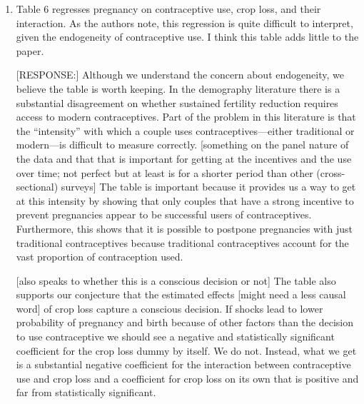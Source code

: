\documentclass[letterpaper,12pt]{article}
\begin{document}
\begin{enumerate}
[RESPONSE:] The 0.000 coefficients were predominantly for variables
involving initial assets. 
We have changed the variable definition for assets, so that it is
now measured in 1,000,000 TZS. 

Note that there are still a few places---mainly for estimations
involving the use of modern contraceptives---where the estimated 
coefficients are so small that presenting additional digits does not make
much economic sense.
In those cases the standard errors are always equal to or larger than
the coefficients.
See, for example, Table A-8 on the effects of log crop loss.


\item Table 6 regresses pregnancy on contraceptive use, crop loss, and
their interaction. As the authors note, this regression is quite
difficult to interpret, given the endogeneity of contraceptive use. I
think this table adds little to the paper.

[RESPONSE:] Although we understand the concern about endogeneity, 
we believe the table is worth keeping. 
In the demography literature there is a substantial disagreement on whether
sustained fertility reduction requires access to modern contraceptives.
Part of the problem in this literature is that the ``intensity'' with
which a couple uses contraceptives---either traditional or modern---is
difficult to measure correctly.
[something on the panel nature of the data and that that is important
for getting at the incentives and the use over time; not perfect but
at least is for a shorter period than other (cross-sectional) surveys]
The table is important because it provides us a way to get at this
intensity by showing that only couples that have a strong incentive to
prevent pregnancies appear to be successful users of contraceptives.
Furthermore, this shows that it is possible to postpone pregnancies with
just traditional contraceptives because traditional contraceptives account 
for the vast proportion of contraception used.

[also speaks to whether this is a conscious decision or not] 
The table also supports our conjecture that the estimated effects 
[might need a less causal word] 
of crop loss capture a conscious decision. 
If shocks lead to lower probability of pregnancy and birth because
of other factors than the decision to use contraceptive we should see
a negative and statistically significant coefficient for the crop loss
dummy by itself.
We do not.
Instead, what we get is a substantial negative coefficient for the interaction
between contraceptive use and crop loss and a coefficient for crop loss 
on its own that is positive and far from statistically significant.



\end{enumerate}
\end{document}
